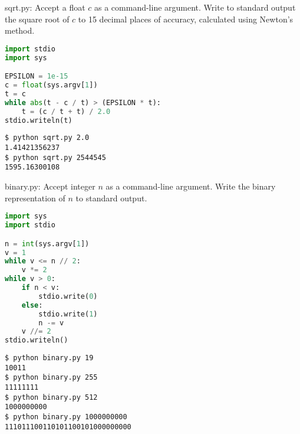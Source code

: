 \documentclass[8pt,a4paper,compress]{beamer}
\begin{document}
\begin{frame}[fragile]
\pause

\begin{framed}
\tiny sqrt.py: Accept a float $c$ as a command-line argument. Write to standard output the square root of $c$ to 15 decimal places of accuracy, calculated using Newton's method.
\end{framed}

\begin{lstlisting}[language=Python]
import stdio
import sys

EPSILON = 1e-15
c = float(sys.argv[1])
t = c
while abs(t - c / t) > (EPSILON * t):
    t = (c / t + t) / 2.0
stdio.writeln(t)
\end{lstlisting}

\pause

\begin{lstlisting}[language={}]
$ python sqrt.py 2.0
1.41421356237
$ python sqrt.py 2544545
1595.16300108
\end{lstlisting}
\end{frame}

\begin{frame}[fragile]
\pause

\begin{framed}
\tiny binary.py: Accept integer $n$ as a command-line argument. Write the binary representation of $n$ to standard output.
\end{framed}

\begin{lstlisting}[language=Python]
import sys
import stdio

n = int(sys.argv[1])
v = 1
while v <= n // 2:
    v *= 2
while v > 0:
    if n < v:
        stdio.write(0)
    else:
        stdio.write(1)
        n -= v
    v //= 2
stdio.writeln()
\end{lstlisting}

\pause

\begin{lstlisting}[language={}]
$ python binary.py 19
10011
$ python binary.py 255
11111111
$ python binary.py 512
1000000000
$ python binary.py 1000000000
111011100110101100101000000000
\end{lstlisting}
\end{frame}
\end{document}
